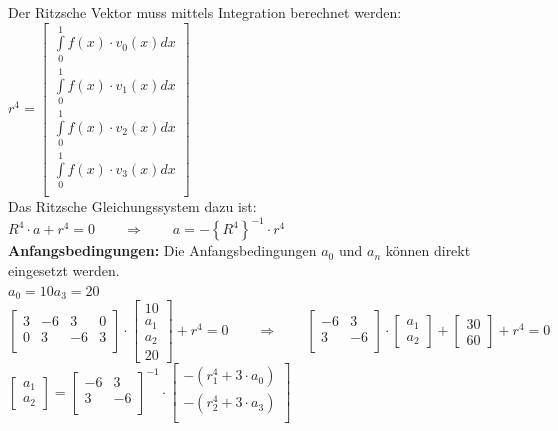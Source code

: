 Der Ritzsche Vektor muss mittels Integration berechnet werden:\\

$r^4=
\begin{bmatrix}
	\int\limits_{0}^{1}{f(x)\cdot v_0(x)dx}\\
	\int\limits_{0}^{1}{f(x)\cdot v_1(x)dx}\\
	\int\limits_{0}^{1}{f(x)\cdot v_2(x)dx}\\
	\int\limits_{0}^{1}{f(x)\cdot v_3(x)dx}\\
\end{bmatrix}$\\

Das Ritzsche Gleichungssystem dazu ist: $\boxed{R^4\cdot a+r^4=0} \qquad\Rightarrow\qquad a=-\left\{R^4\right\}^{-1}\cdot r^4$\\

\textbf{Anfangsbedingungen:} Die Anfangsbedingungen $a_0$ und $a_n$ können direkt eingesetzt werden.\\

$a_0=10$\qquad$a_3=20$\\

$
	\begin{bmatrix}
		3 & -6 & 3 & 0 \\
		0 & 3 & -6 & 3 \\
	\end{bmatrix}\cdot
	\begin{bmatrix}
		10\\a_1\\a_2\\20
	\end{bmatrix}+r^4=0\qquad\Rightarrow\qquad
	\begin{bmatrix}
		-6 & 3 \\
		 3 & -6 \\
	\end{bmatrix}\cdot
	\begin{bmatrix}
		a_1\\a_2
	\end{bmatrix}+
	\begin{bmatrix}
		30\\60
	\end{bmatrix}+
	r^4=0
$\\

$
	\begin{bmatrix}
			a_1\\a_2
	\end{bmatrix}=
	\begin{bmatrix}
		-6 & 3 \\
	 	 3 & -6 \\
	\end{bmatrix}^{-1}\cdot
	\begin{bmatrix}
		-\left(r^4_1+3\cdot a_0\right)\\
		-\left(r^4_2+3\cdot a_3\right)\\
	\end{bmatrix}		
$

